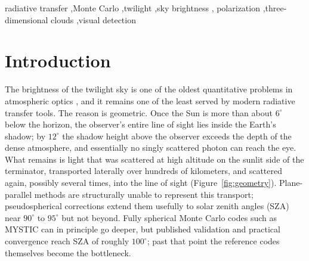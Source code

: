 \documentclass[preprint,12pt]{elsarticle}
\begin{document}
\begin{frontmatter}
\begin{abstract}
of the tier, one-dimensional and three-dimensional cloud paths alike,
statistically consistent with its reference (ratios 0.87 to 1.19).
Against measurements: the simulated zenith twilight decay reproduces
published sky-brightness data to 1.2 to 5.5\% per magnitude of decay.
Against human observation: a psychophysical detection layer, calibrated
once against desert campaigns reporting a documented central-mean dawn,
reproduces the dawn
detection times of sixteen published visual and instrumental campaigns
with a median absolute residual of $0.26^\circ$ of solar depression over
the fourteen scored rows, including an out-of-sample seasonal sweep at
$52^\circ$N. The
model, its validation caches, and every table in this paper are
reproducible from the public repository.
\end{abstract}

\begin{keyword}
radiative transfer \sep Monte Carlo \sep twilight \sep sky brightness \sep
polarization \sep three-dimensional clouds \sep visual detection
\end{keyword}

\end{frontmatter}

\section{Introduction}
\label{sec:intro}

The brightness of the twilight sky is one of the oldest quantitative
problems in atmospheric optics \citep{rozenberg1966}, and it remains one of
the least served by modern radiative transfer tools. The reason is
geometric. Once the Sun is more than about $6^\circ$ below the horizon, the
observer's entire line of sight lies inside the Earth's shadow; by
$12^\circ$ the shadow height above the observer exceeds the depth of the
dense atmosphere, and essentially no singly scattered photon can reach the
eye. What remains is light that was scattered at high altitude on the
sunlit side of the terminator, transported laterally over hundreds of
kilometers, and scattered again, possibly several times, into the line of
sight (Figure~\ref{fig:geometry}). Plane-parallel methods are structurally unable to represent this
transport; pseudospherical corrections extend them usefully to solar zenith
angles (SZA) near $90^\circ$ to $95^\circ$ but not beyond. Fully spherical
Monte Carlo codes such as MYSTIC \citep{mayer2009,emde2016} can in
principle go deeper, but published validation and practical convergence
reach SZA of roughly $100^\circ$; past that point the reference codes
themselves become the bottleneck.
\end{document}
